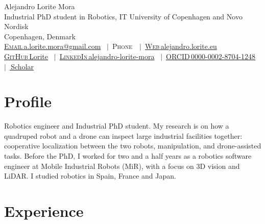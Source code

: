 \documentclass[a4paper,11pt]{article}
\newif\ifhaveicons
\newcommand{\icon}[2]{\ifhaveicons#1\else\textsc{#2}\fi\,}
\newcommand*{\cvphone}{}
\begin{document}
\begin{center}
    {\Huge Alejandro Lorite Mora}\\[4pt]
    {\large Industrial PhD student in Robotics, IT University of Copenhagen and Novo Nordisk}\\[2pt]
    Copenhagen, Denmark \\[4pt]
    \href{mailto:a.lorite.mora@gmail.com}{\icon{\faEnvelope}{Email}a.lorite.mora@gmail.com}
    \ifx\cvphone\empty\else\ $|$\ \icon{\faPhone}{Phone}\cvphone\fi
    \ $|$\ \href{https://alejandro.lorite.eu}{\icon{\faGlobe}{Web}alejandro.lorite.eu}\\[2pt]
    \href{https://github.com/Lorite}{\icon{\faGithub}{GitHub}Lorite}
    \ $|$\ \href{https://www.linkedin.com/in/alejandro-lorite-mora}{\icon{\faLinkedin}{LinkedIn}alejandro-lorite-mora}
    \ $|$\ \href{https://orcid.org/0000-0002-8704-1248}{\icon{\faOrcid}{ORCID}0000-0002-8704-1248}
    \ $|$\ \href{https://scholar.google.es/citations?user=M5fEBD8AAAAJ&hl=en}{\icon{\faGraduationCap}{}Scholar}
\end{center}

\section{Profile}
Robotics engineer and Industrial PhD student. My research is on how a quadruped robot and a drone can inspect large industrial facilities together: cooperative localization between the two robots, manipulation, and drone-assisted tasks. Before the PhD, I worked for two and a half years as a robotics software engineer at Mobile Industrial Robots (MiR), with a focus on 3D vision and LiDAR. I studied robotics in Spain, France and Japan.

\section{Experience}
\end{document}
